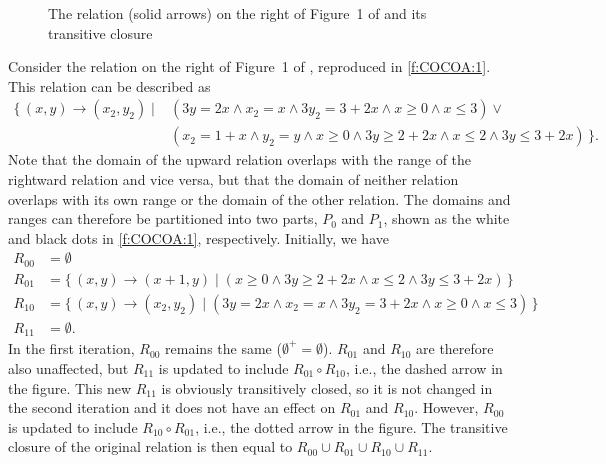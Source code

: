 \begin{figure}
\begin{center}
\end{center}
\caption{The relation (solid arrows) on the right of Figure~1 of
\protect{} and its transitive closure}
\label{f:COCOA:1}
\end{figure}
\begin{example}
Consider the relation on the right of Figure~1 of
,
reproduced in \autoref{f:COCOA:1}.
This relation can be described as
$$
\begin{aligned}
\{\, (x, y) \to (x_2, y_2) \mid {} & (3y = 2x \wedge x_2 = x \wedge 3y_2 = 3 + 2x \wedge x \ge 0 \wedge x \le 3) \vee {} \\
& (x_2 = 1 + x \wedge y_2 = y \wedge x \ge 0 \wedge 3y \ge 2 + 2x \wedge x \le 2 \wedge 3y \le 3 + 2x) \,\}
.
\end{aligned}
$$
Note that the domain of the upward relation overlaps with the range
of the rightward relation and vice versa, but that the domain
of neither relation overlaps with its own range or the domain of
the other relation.
The domains and ranges can therefore be partitioned into two parts,
$P_0$ and $P_1$, shown as the white and black dots in \autoref{f:COCOA:1},
respectively.
Initially, we have
$$
\begin{aligned}
R_{00} & = \emptyset
\\
R_{01} & = 
\{\, (x, y) \to (x+1, y) \mid 
(x \ge 0 \wedge 3y \ge 2 + 2x \wedge x \le 2 \wedge 3y \le 3 + 2x) \,\}
\\
R_{10} & =
\{\, (x, y) \to (x_2, y_2) \mid (3y = 2x \wedge x_2 = x \wedge 3y_2 = 3 + 2x \wedge x \ge 0 \wedge x \le 3) \,\}
\\
R_{11} & = \emptyset
.
\end{aligned}
$$
In the first iteration, $R_{00}$ remains the same ($\emptyset^+ = \emptyset$).
$R_{01}$ and $R_{10}$ are therefore also unaffected, but
$R_{11}$ is updated to include $R_{01} \circ R_{10}$, i.e.,
the dashed arrow in the figure.
This new $R_{11}$ is obviously transitively closed, so it is not
changed in the second iteration and it does not have an effect
on $R_{01}$ and $R_{10}$.  However, $R_{00}$ is updated to
include $R_{10} \circ R_{01}$, i.e., the dotted arrow in the figure.
The transitive closure of the original relation is then equal to
$R_{00} \cup R_{01} \cup R_{10} \cup R_{11}$.
\end{example}

